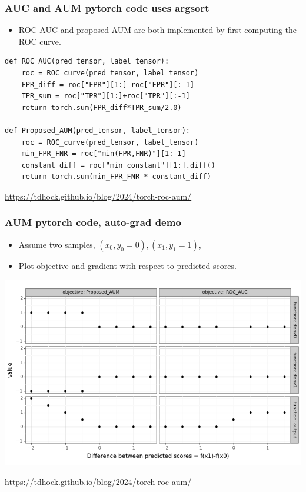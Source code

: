 \documentclass[t]{beamer}
\begin{document}
\begin{frame}[fragile]
  \frametitle{AUC and AUM pytorch code uses argsort}

  \begin{itemize}
  \item ROC AUC and proposed AUM are both implemented by first
    computing the ROC curve.
  \end{itemize}
  \begin{verbatim}
def ROC_AUC(pred_tensor, label_tensor):
    roc = ROC_curve(pred_tensor, label_tensor)
    FPR_diff = roc["FPR"][1:]-roc["FPR"][:-1]
    TPR_sum = roc["TPR"][1:]+roc["TPR"][:-1]
    return torch.sum(FPR_diff*TPR_sum/2.0)

def Proposed_AUM(pred_tensor, label_tensor):
    roc = ROC_curve(pred_tensor, label_tensor)
    min_FPR_FNR = roc["min(FPR,FNR)"][1:-1]
    constant_diff = roc["min_constant"][1:].diff()
    return torch.sum(min_FPR_FNR * constant_diff)
\end{verbatim}

  \url{https://tdhock.github.io/blog/2024/torch-roc-aum/}
\end{frame}

\begin{frame}[fragile]
  \frametitle{AUM pytorch code, auto-grad demo}

  \begin{itemize}
  \item Assume two samples, $(x_0,y_0=0), (x_1,y_1=1)$,
  \item Plot objective and gradient with respect to predicted scores.
  \end{itemize}

  \includegraphics[width=\textwidth]{gg_aum_grad}

  \url{https://tdhock.github.io/blog/2024/torch-roc-aum/}
\end{frame}
\end{document}
